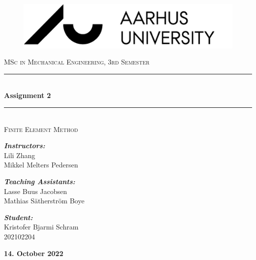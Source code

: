 \documentclass{article}
\begin{document}

\newcommand{\HRule}{\rule{\linewidth}{0.5mm}} %

\begin{center}
    \vspace*{0.5 cm}

\begin{figure}[!ht]
\centering
   \includegraphics[width=130mm]{Photos/aulogo.png}
\end{figure}    
\vspace{2.5cm}

\textsc{\Large MSc in Mechanical Engineering, 3rd Semester}\\[0.7 cm]
   
\rule{\linewidth}{0.5 mm} \\[0.3 cm]
{ \Huge \bfseries Assignment 2}\\
{\rule{\linewidth}{0.5 mm}} \\[1 cm]
	
\textsc{\LARGE Finite Element Method}\\[0.35 cm]
    
\vspace{.4cm}    

\center 
\Large
\emph{\textbf{Instructors:}} \\
Lili Zhang\\
Mikkel Melters Pedersen\\
\vspace{0.5cm}

\center 
\Large
\emph{\textbf{Teaching Assistants:}} \\
Lasse Buus Jacobsen\\
Mathias Sätherström Boye\\
\vspace{1cm}  

\center
\emph{\textbf{Student:}}\\ %
Kristofer Bjarmi Schram \\
202102204\\

\vspace{1cm}
 
\textbf{\large 14. October 2022}

\vfill %
\end{center}
\newpage
\end{document}
